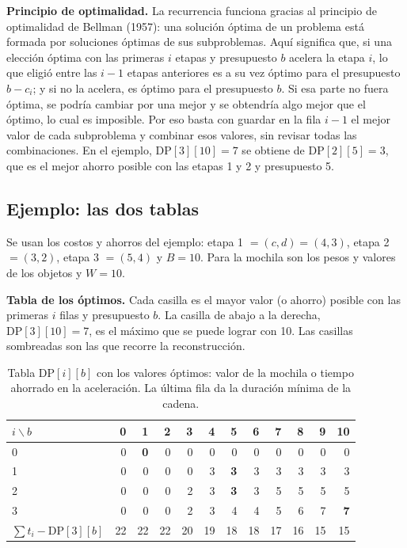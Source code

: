 \documentclass[11pt,a4paper]{article}
\newcommand{\DP}[2]{\mathrm{DP}[#1][#2]}
\theoremstyle{plano}
\begin{document}
\textbf{Principio de optimalidad.} La recurrencia funciona gracias al principio de optimalidad de Bellman (1957): una solución óptima de un problema está formada por soluciones óptimas de sus subproblemas. Aquí significa que, si una elección óptima con las primeras $i$ etapas y presupuesto $b$ acelera la etapa $i$, lo que eligió entre las $i-1$ etapas anteriores es a su vez óptimo para el presupuesto $b-c_i$; y si no la acelera, es óptimo para el presupuesto $b$. Si esa parte no fuera óptima, se podría cambiar por una mejor y se obtendría algo mejor que el óptimo, lo cual es imposible. Por eso basta con guardar en la fila $i-1$ el mejor valor de cada subproblema y combinar esos valores, sin revisar todas las combinaciones. En el ejemplo, $\DP{3}{10}=7$ se obtiene de $\DP{2}{5}=3$, que es el mejor ahorro posible con las etapas 1 y 2 y presupuesto 5.

\subsection{Ejemplo: las dos tablas}

Se usan los costos y ahorros del ejemplo: etapa 1 $=(c,d)=(4,3)$, etapa 2 $=(3,2)$, etapa 3 $=(5,4)$ y $B=10$. Para la mochila son los pesos y valores de los objetos y $W=10$.

\textbf{Tabla de los óptimos.} Cada casilla es el mayor valor (o ahorro) posible con las primeras $i$ filas y presupuesto $b$. La casilla de abajo a la derecha, $\DP{3}{10}=7$, es el máximo que se puede lograr con 10. Las casillas sombreadas son las que recorre la reconstrucción.

\begin{table}[h]
\centering\small
\setlength{\tabcolsep}{4.5pt}
\begin{tabular}{lrrrrrrrrrrr}
\toprule
$i\backslash b$ & 0 & 1 & 2 & 3 & 4 & 5 & 6 & 7 & 8 & 9 & 10 \\
\midrule
0 & 0 & \cellcolor{celda}\textbf{0} & 0 & 0 & 0 & 0 & 0 & 0 & 0 & 0 & 0 \\
1 & 0 & 0 & 0 & 0 & 3 & \cellcolor{celda}\textbf{3} & 3 & 3 & 3 & 3 & 3 \\
2 & 0 & 0 & 0 & 2 & 3 & \cellcolor{celda}\textbf{3} & 3 & 5 & 5 & 5 & 5 \\
3 & 0 & 0 & 0 & 2 & 3 & 4 & 4 & 5 & 6 & 7 & \cellcolor{celda}\textbf{7} \\
\midrule
$\sum t_i - \mathrm{DP}[3][b]$ & 22 & 22 & 22 & 20 & 19 & 18 & 18 & 17 & 16 & 15 & 15 \\
\bottomrule
\end{tabular}
\caption{Tabla $\DP{i}{b}$ con los valores óptimos: valor de la mochila o tiempo ahorrado en la aceleración. La última fila da la duración mínima de la cadena.}
\label{tab:moch-opt}
\end{table}
\end{document}
